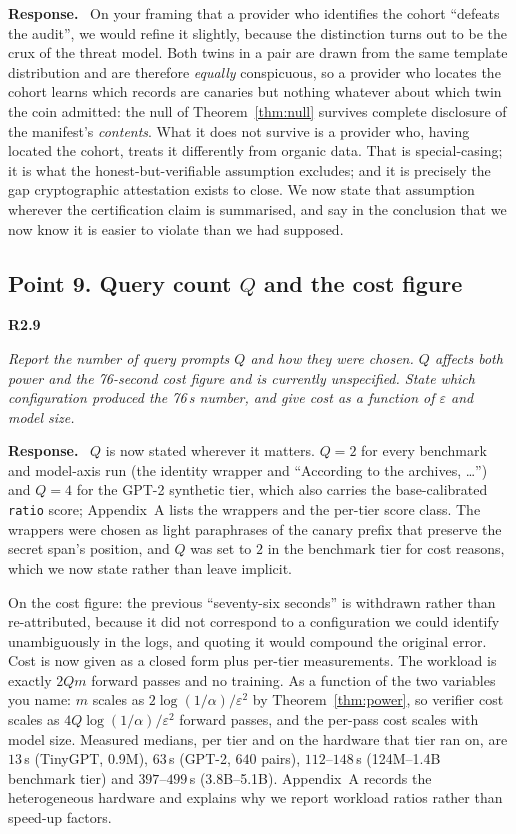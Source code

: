 \documentclass[11pt,a4paper]{article}
\newcommand{\eps}{\varepsilon}
\newenvironment{point}[1]{%
  \par\medskip\noindent\textbf{\color{rcol}#1}\par\nopagebreak\smallskip\begingroup
  \color{rcol}\itshape}{\endgroup\par}
\newenvironment{reply}{%
  \par\smallskip\noindent\textbf{\color{acol}Response.}\ \begingroup}{\endgroup\par}
\begin{document}
\begin{reply}
On your framing that a provider who identifies the cohort ``defeats the audit'', we
would refine it slightly, because the distinction turns out to be the crux of the threat
model. Both twins in a pair are drawn from the same template distribution and are
therefore \emph{equally} conspicuous, so a provider who locates the cohort learns which
records are canaries but nothing whatever about which twin the coin admitted: the null
of Theorem~\ref{thm:null} survives complete disclosure of the manifest's \emph{contents}. What it
does not survive is a provider who, having located the cohort, treats it differently
from organic data. That is special-casing; it is what the honest-but-verifiable
assumption excludes; and it is precisely the gap cryptographic attestation exists to
close. We now state that assumption wherever the certification claim is summarised, and
say in the conclusion that we now know it is easier to violate than we had supposed.
\end{reply}

\subsection*{Point 9. Query count $Q$ and the cost figure}

\begin{point}{R2.9}
Report the number of query prompts $Q$ and how they were chosen. $Q$ affects both power
and the 76-second cost figure and is currently unspecified. State which configuration
produced the 76\,s number, and give cost as a function of $\eps$ and model size.
\end{point}

\begin{reply}
$Q$ is now stated wherever it matters. $Q = 2$ for every benchmark and model-axis run
(the identity wrapper and ``According to the archives, \ldots'') and $Q = 4$ for the
GPT-2 synthetic tier, which also carries the base-calibrated \texttt{ratio} score;
Appendix~A lists the wrappers and the per-tier score class. The wrappers were chosen as
light paraphrases of the canary prefix that preserve the secret span's position, and
$Q$ was set to $2$ in the benchmark tier for cost reasons, which we now state rather
than leave implicit.

On the cost figure: the previous ``seventy-six seconds'' is withdrawn rather than
re-attributed, because it did not correspond to a configuration we could identify
unambiguously in the logs, and quoting it would compound the original error. Cost is
now given as a closed form plus per-tier measurements. The workload is exactly $2Qm$
forward passes and no training. As a function of the two variables you name: $m$ scales
as $2\log(1/\alpha)/\eps^2$ by Theorem~\ref{thm:power}, so verifier cost scales as
$4Q\log(1/\alpha)/\eps^2$ forward passes, and the per-pass cost scales with model size.
Measured medians, per tier and on the hardware that tier ran on, are $13$\,s (TinyGPT,
0.9M), $63$\,s (GPT-2, $640$ pairs), $112$--$148$\,s (124M--1.4B benchmark tier) and
$397$--$499$\,s (3.8B--5.1B). Appendix~A records the heterogeneous hardware and explains
why we report workload ratios rather than speed-up factors.
\end{reply}
\end{document}
